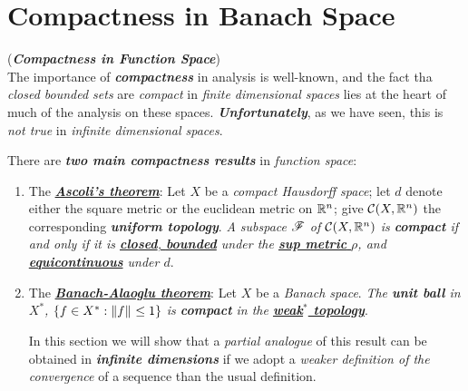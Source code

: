 \documentclass[11pt]{article}
\begin{document}
\section{Compactness in Banach Space}
\begin{remark} (\emph{\textbf{Compactness in Function Space}})\\
The importance of \emph{\textbf{compactness}} in analysis is well-known, and the fact tha \emph{closed bounded sets} are \emph{compact} in \emph{finite dimensional spaces} lies at the heart of much of the analysis on these spaces. \emph{\textbf{Unfortunately}}, as we have seen, this is \emph{not true} in \emph{infinite dimensional spaces}.

There are \emph{\textbf{two main compactness results}} in \emph{function space}:
\begin{enumerate}
\item The \underline{\textbf{\emph{Ascoli's theorem}}}: Let $X$ be a \emph{compact Hausdorff space}; let $d$ denote either the square metric or the euclidean metric on ${\mathbb R}^n$; give ${\mathcal C}(X, {\mathbb R}^n)$ the corresponding \textbf{\emph{uniform topology}}. \emph{A subspace ${\mathscr F}$ of ${\mathcal C}(X, {\mathbb R}^n)$ is \textbf{compact} if and only if it is \underline{\textbf{closed}, \textbf{bounded}} under the \underline{\textbf{sup metric} $\rho$}, and \underline{\textbf{equicontinuous}} under $d$}.

\item The \underline{\textbf{\emph{Banach-Alaoglu theorem}}}: Let $X$ be a \emph{Banach space}. \emph{The \textbf{unit ball} in $X^{*}$, $\{f \in X^{*}: \left\|f\right\|_{}\le 1\}$ is \textbf{compact} in the \underline{\textbf{weak$^{*}$ topology}}}.

In this section we will show that a \emph{partial analogue} of this result can be obtained in \emph{\textbf{infinite dimensions}} if we adopt a \emph{weaker definition of the convergence} of a sequence than the usual definition.
\end{enumerate}
\end{remark}
\end{document}
